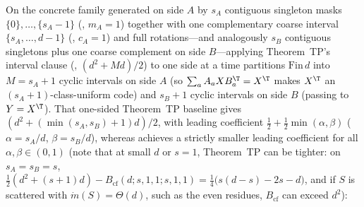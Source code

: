 On the concrete family  generated on side $A$ by $s_A$ contiguous
singleton masks $\{0\}, \dots, \{s_A - 1\}$ (, $m_A = 1$) together with one
complementary coarse interval $\{s_A, \dots, d - 1\}$ (, $c_A = 1$)
and full rotations---and analogously $s_B$ contiguous singletons plus one coarse complement on side
$B$---applying Theorem~TP's interval clause (\cite[Theorem~6.4]{SeventeenthPaper2026}, $(d^2 + Md)/2$)
to one side at a time partitions $\mathrm{Fin}\,d$ into $M = s_A + 1$ cyclic intervals on side $A$ (so
$\sum_a A_a X B_a^{\T} = X^{\T}$ makes $X^{\T}$ an $(s_A + 1)$-class-uniform code) and $s_B + 1$
cyclic intervals on side $B$ (passing to $Y = X^{\T}$). That one-sided Theorem~TP baseline gives
$(d^2 + (\min(s_A, s_B) + 1)d)/2$, with leading coefficient $\frac{1}{2} + \frac{1}{2}\min(\alpha,
\beta)$ ($\alpha = s_A / d$, $\beta = s_B / d$), whereas  achieves a
strictly smaller leading coefficient for all $\alpha, \beta \in (0, 1)$ (note that at small $d$ or
$s = 1$, Theorem~TP can be tighter: on $s_A = s_B = s$,
$\frac{1}{2}(d^2 + (s+1)d) - B_{\mathrm{cf}}(d; s,1,1; s,1,1) = \frac{1}{4}\bigl(s(d - s) - 2s - d\bigr)$,
and if $S$ is scattered with $\dot{m}(S) = \Theta(d)$, such as the even residues, $B_{\mathrm{cf}}$
can exceed $d^2$):

